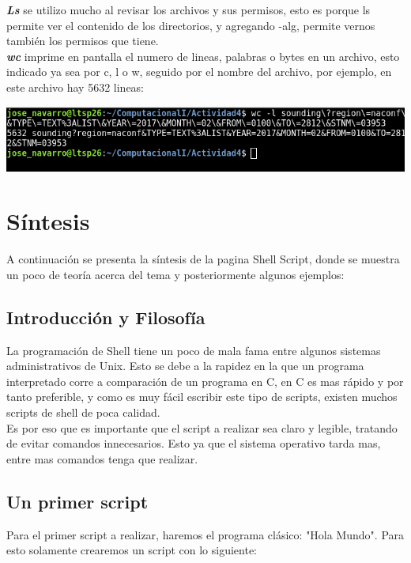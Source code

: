 \documentclass[12pt]{article}
\begin{document}
\textbf{\textit{Ls}} se utilizo mucho al revisar los archivos y sus permisos, esto es porque ls permite ver el contenido de los directorios, y agregando -alg, permite vernos también los permisos que tiene. \\

\textbf{\textit{wc}} imprime en pantalla el numero de lineas, palabras o bytes en un archivo, esto indicado ya sea por c, l o w, seguido por el nombre del archivo, por ejemplo, en este archivo hay 5632 lineas:

\begin{center}
\includegraphics[scale=0.55]{wc.png}
\end{center} 

\section{Síntesis}
A continuación se presenta la síntesis de la pagina Shell Script, donde se muestra un poco de teoría acerca del tema y posteriormente algunos ejemplos:

\subsection{Introducción y Filosofía}
La programación de Shell tiene un poco de mala fama entre algunos sistemas administrativos de Unix. Esto se debe a la rapidez en la que un programa interpretado corre a comparación de un programa en C, en C es mas rápido y por tanto preferible, y como es muy fácil escribir este tipo de scripts, existen muchos scripts de shell de poca calidad. \\

Es por eso que es importante que el script a realizar sea claro y legible, tratando de evitar comandos innecesarios. Esto ya que el sistema operativo tarda mas, entre mas comandos tenga que realizar.  

\subsection{Un primer script}
Para el primer script a realizar, haremos el programa clásico: "Hola Mundo". Para esto solamente crearemos un script con lo siguiente:
\end{document}
